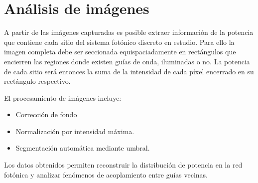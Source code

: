 \section{Análisis de imágenes \label{sec:analimag}}
A partir de las imágenes capturadas es posible extraer información de la potencia que contiene cada sitio del sistema fotónico discreto en estudio. Para ello la imagen completa debe ser seccionada equispaciadamente en rectángulos que encierren las regiones donde existen guías de onda, iluminadas o no. La potencia de cada sitio será entonces la suma de la intensidad de cada píxel encerrado en su rectángulo respectivo.

El procesamiento de imágenes incluye:
\begin{itemize}
    \item Corrección de fondo
    \item Normalización por intensidad máxima.
    \item Segmentación automática mediante umbral.
\end{itemize}

Los datos obtenidos permiten reconstruir la distribución de potencia en la red fotónica y analizar fenómenos de acoplamiento entre guías vecinas.